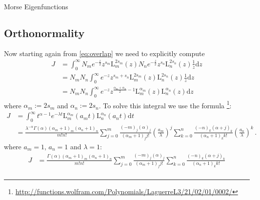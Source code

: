 \begin{chapter}{Morse Eigenfunctions}
\subsection{Orthonormality}

Now starting again from \eqref{eq:overlap} we need to explicitly compute
\begin{equation}
  \begin{split}
    J
    & = \int_{0}^{\infty} N_{m} e^{-\frac{z}{2}} z^{s_{m}} \mathrm{L}_{m}^{2s_{m}}(z)
                          N_{n} e^{-\frac{z}{2}} z^{s_{n}} \mathrm{L}_{n}^{2s_{n}}(z)
                          \frac{1}{z} \mathrm{d}z \\
    & = N_{m} N_{n} \int_{0}^{\infty} e^{-z} z^{s_{m}+s_{n}}
					  \mathrm{L}_{m}^{2s_{m}}(z)
					  \mathrm{L}_{n}^{2s_{n}}(z)
					  \frac{1}{z} \mathrm{d}z \\
	& = N_{m} N_{n} \int_{0}^{\infty} e^{-z} z^{\frac{\alpha_{m}+\alpha_{n}}{2}-1}
					  \mathrm{L}_{m}^{\alpha_{m}}(z)
					  \mathrm{L}_{n}^{\alpha_{n}}(z)
					  \mathrm{d}z
      \end{split}
    \end{equation}
    where $\alpha_{m} := 2s_{m}$ and $\alpha_{n} := 2s_{n}$.
    To solve this integral we use the formula
    \footnote{ \url{http://functions.wolfram.com/Polynomials/LaguerreL3/21/02/01/0002/}}:
    \begin{equation*}
      \begin{split}
	J
	& = \int_{0}^{\infty} t^{\alpha-1} e^{-\lambda t} \mathrm{L}_{m}^{\alpha_{m}}(a_{m} t) \mathrm{L}_{n}^{\alpha_{n}}(a_{n} t) \mathrm{d}t \\
	& = \frac{\lambda^{-\alpha}\Gamma(\alpha) \left(\alpha_{m}+1\right)_{m} \left(\alpha_{n}+1\right)_{n}}{m! n!}
	\sum_{j=0}^{m} \frac{(-m)_{j} (\alpha)_{j}}{\left(\alpha_{m}+1\right)_{j} j!} \left(\frac{a_{m}}{\lambda}\right)^{j}
	\sum_{k=0}^{n} \frac{(-n)_{k} (\alpha+j)_{k}}{\left(\alpha_{n}+1\right)_{k} k!} \left(\frac{a_{n}}{\lambda}\right)^{k} \,.
      \end{split}
    \end{equation*}
    where $a_{m} = 1$, $a_{n} = 1$ and $\lambda = 1$:
    \begin{equation*}
      \begin{split}
	J
	& = \frac{\Gamma(\alpha) \left(\alpha_{m}+1\right)_{m} \left(\alpha_{n}+1\right)_{n}}{m! n!}
	\sum_{j=0}^{m} \frac{(-m)_{j} (\alpha)_{j}}{\left(\alpha_{m}+1\right)_{j} j!}
	\sum_{k=0}^{n} \frac{(-n)_{k} (\alpha+j)_{k}}{\left(\alpha_{n}+1\right)_{k} k!} \\

\end{split}
\end{equation*}
\end{chapter}
